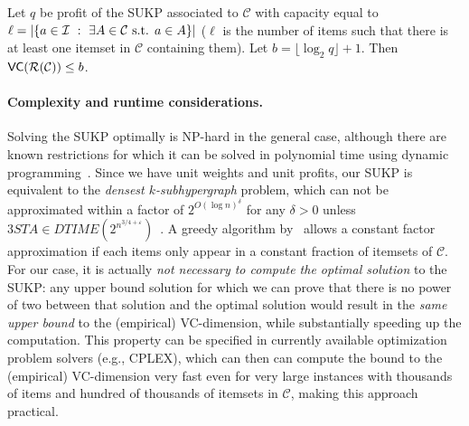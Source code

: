 \begin{corollary}\label{lem:sukpvc}
  Let $q$ be profit of the SUKP associated to $\mathcal{C}$ with capacity
  equal to $\ell=|\{a\in{\cal I} ~:~ \exists A\in\mathcal{C} \mbox{ s.t. } a\in
  A\}|$ ($\ell$ is the number of items such that there is at least one itemset in $\mathcal{C}$ containing
  them).
  Let $b=\lfloor\log_2 q\rfloor + 1$. Then
  $\mathsf{VC}(\mathcal{R}(\mathcal{C}))\le b$. %
\end{corollary}

\paragraph{Complexity and runtime considerations.} Solving the SUKP optimally is
NP-hard in the general case, although there are known restrictions for
which it can be solved in polynomial time using dynamic
programming~\citep{GoldschmidtNY94}. Since we have unit weights and unit
profits, our SUKP is equivalent to the \emph{densest $k$-subhypergraph} problem,
which can not be approximated within a factor of $2^{O(\log n)^\delta}$ for any
$\delta>0$ unless $3STA \in
DTIME(2^{n^{3/4+\varepsilon}})$~\citep{HajiaghayiJKLMRSV06}. A greedy algorithm
by~\citet{Arulselvan14} allows a constant factor approximation if each
items only appear in a constant fraction of itemsets of $\mathcal{C}$.
For our case, it is actually \emph{not necessary to compute the optimal
solution} to the SUKP: any upper bound solution for which we can prove that
there is no power of two between that solution and the optimal solution would
result in the \emph{same upper bound} to the (empirical) VC-dimension, while
substantially speeding up the computation. This property can be specified in
currently available optimization problem solvers (e.g., CPLEX), which can then can compute the
bound to the (empirical) VC-dimension very fast even for very large instances
with thousands of items and hundred of thousands of itemsets in $\mathcal{C}$,
making this approach practical.

